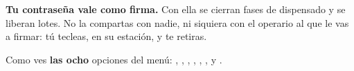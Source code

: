 

\tablaAcceso

\vspace{8pt}

\reglasAcceso


\begin{cajaOjo}
\textbf{Tu contraseña vale como firma.} Con ella se cierran fases de dispensado y se
liberan lotes. No la compartas con nadie, ni siquiera con el operario al que le vas
a firmar: tú tecleas, en su estación, y te retiras.
\end{cajaOjo}

\avisoValidacion

\newpage
{}

Como \manualRol{} ves \textbf{las ocho} opciones del menú: ,
, , , ,
,  y .

